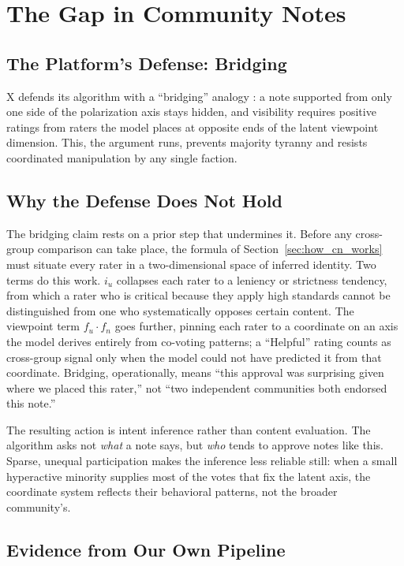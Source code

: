 \documentclass[10pt,twocolumn]{article}
\begin{document}
\section{The Gap in Community Notes}
\label{sec:the_gap}

\subsection*{The Platform's Defense: Bridging}
X defends its algorithm with a ``bridging'' analogy \cite{xcommunitynotes2026ranking}: a note supported from only one side of the polarization axis stays hidden, and visibility requires positive ratings from raters the model places at opposite ends of the latent viewpoint dimension. This, the argument runs, prevents majority tyranny and resists coordinated manipulation by any single faction.

\subsection*{Why the Defense Does Not Hold}
The bridging claim rests on a prior step that undermines it. Before any cross-group comparison can take place, the formula of Section~\ref{sec:how_cn_works} must situate every rater in a two-dimensional space of inferred identity. Two terms do this work. $i_u$ collapses each rater to a leniency or strictness tendency, from which a rater who is critical because they apply high standards cannot be distinguished from one who systematically opposes certain content. The viewpoint term $f_u \cdot f_n$ goes further, pinning each rater to a coordinate on an axis the model derives entirely from co-voting patterns; a ``Helpful'' rating counts as cross-group signal only when the model could not have predicted it from that coordinate. Bridging, operationally, means ``this approval was surprising given where we placed this rater,'' not ``two independent communities both endorsed this note.''

The resulting action is intent inference rather than content evaluation. The algorithm asks not \textit{what} a note says, but \textit{who} tends to approve notes like this. Sparse, unequal participation makes the inference less reliable still: when a small hyperactive minority supplies most of the votes that fix the latent axis, the coordinate system reflects their behavioral patterns, not the broader community's.

\subsection*{Evidence from Our Own Pipeline}
\end{document}

